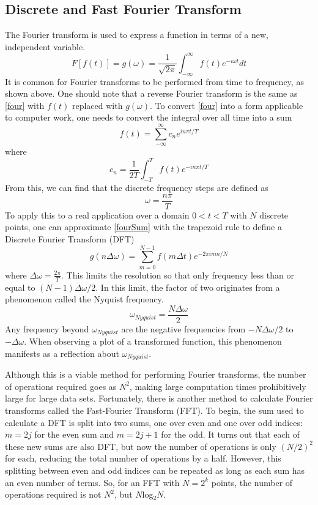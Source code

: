 \documentclass[12pt]{article}
\begin{document}
\subsection{Discrete and Fast Fourier Transform}
The Fourier transform is used to express a function in terms of a new, independent variable. 
\begin{equation}
\label{four}
F[f(t)]=g(\omega)=\frac{1}{\sqrt{2\pi}} \int_{-\infty}^\infty f(t) e^{-i\omega t} dt
\end{equation}
It is common for Fourier transforms to be performed from time to frequency, as shown above.  One should note that a reverse Fourier transform is the same as \eqref{four} with $f(t)$ replaced with $g(\omega)$.  To convert \eqref{four} into a form applicable to computer work, one needs to convert the integral over all time into a sum
\begin{equation}
\label{fourSum}
f(t)=\sum_{-\infty}^\infty c_n e^{i n \pi t /T}
\end{equation}
where
\begin{equation}
\label{fourCoef}
c_n = \frac{1}{2T} \int_{-T}^T f(t) e^{-i n \pi t /T}
\end{equation}
From this, we can find that the discrete frequency steps are defined as
\begin{equation}
\label{Omeg}
\omega = \frac{n\pi}{T}
\end{equation}
To apply this to a real application over a domain $0<t<T$ with $N$ discrete points, one can approximate \eqref{fourSum} with the trapezoid rule to define a Discrete Fourier Transform (DFT)
\begin{equation}
\label{fourDis}
g(n \Delta \omega) = \sum_{m=0}^{N-1} f(m \Delta t) e^{-2 \pi i m n/N}
\end{equation}
where $\Delta \omega = \frac{2 \pi}{T}$.  This limits the resolution so that only frequency less than or equal to $(N-1)\Delta \omega /2$.  In this limit, the factor of two originates from a phenomenon called the Nyquist frequency.  
\begin{equation}
\label{nyq}
\omega_{Nyquist} = \frac{N \Delta \omega}{2}
\end{equation}
Any frequency beyond $\omega_{Nyquist}$ are the negative frequencies from $-N \Delta \omega/2$ to $-\Delta \omega$.  When observing a plot of a transformed function, this phenomenon manifests as a reflection about $\omega_{Nyquist}$.

Although this is a viable method for performing Fourier transforms, the number of operations required goes as $N^2$, making large computation times prohibitively large for large data sets.  Fortunately, there is another method to calculate Fourier transforms called the Fast-Fourier Transform (FFT).  To begin, the sum used to calculate a DFT is split into two sums, one over even and one over odd indices:  $m=2j$ for the even sum and $m=2j+1$ for the odd.  It turns out that each of these new sums are also DFT, but now the number of operations is only $(N/2)^2$ for each, reducing the total number of operations by a half.  However, this splitting between even and odd indices can be repeated as long as each sum has an even number of terms.  So, for an FFT with $N=2^k$ points, the number of operations required is not $N^2$, but $N$log$_2 N$.
\end{document}

